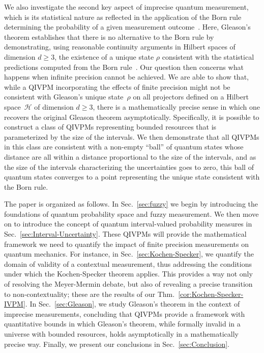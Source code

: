 \documentclass[english,reprint, aps, prl,superscriptaddress, showpacs,
showkeys, longbibliography, amsmath, amssymb, floatfix]{revtex4-1}
\theoremstyle{plain}
\theoremstyle{definition}
\newcommand{\Hilb}{\mathcal{H}}
\newcommand{\andy}[1]{\fbox{\begin{minipage}{0.9\linewidth}\color{blue}{Andy says: #1}\end{minipage}}}
\begin{document}
We also investigate the second key aspect of imprecise quantum
measurement, which is its statistical nature as reflected in the
application of the Born rule determining the probability of a given
measurement outcome~\citep{Born1983bibTeX,Mermin2007,Jaeger2007}.
Here, Gleason's theorem establishes that there is no alternative to
the Born rule by demonstrating, using reasonable continuity arguments
in Hilbert spaces of dimension $d\ge3$, the existence of a unique
state $\rho$ consistent with the statistical predictions computed from
the Born rule~\citep{gleason1957,Redhead1987-REDINA,peres1995quantum}.
Our question then concerns what happens when infinite precision cannot
be achieved.  We are able to show that, while a QIVPM incorporating
the effects of finite precision might not be consistent with Gleason's
unique state~$\rho$ on all projectors defined on a Hilbert
space~$\Hilb$ of dimension $d\ge3$, there is a mathematically precise
sense in which one recovers the original Gleason theorem
asymptotically.  Specifically, it is possible to construct a class of
QIVPMs representing bounded resources that is parameterized by the
size of the intervals. We then demonstrate that all QIVPMs in this
class are consistent with a non-empty ``ball'' of quantum states whose
distance are all within a distance proportional to the size of the
intervals, and as the size of the intervals characterizing the
uncertainties goes to zero, this ball of quantum states converges to a
point representing the unique state consistent with the Born rule. 

The paper is organized as follows.  In Sec.~\ref{sec:fuzzy} we begin
by introducing the foundations of quantum probability space and fuzzy
measurement.  We then move on to introduce the concept of quantum
interval-valued probability measures in
Sec.~\ref{sec:Interval-Uncertainty}.  These QIVPMs will provide the
mathematical framework we need to quantify the impact of finite
precision measurements on quantum mechanics.  For instance, in
Sec.~\ref{sec:Kochen-Specker}, we quantify the domain of validity of a
contextual measurement, thus addressing the conditions under which the
Kochen-Specker theorem applies.  This provides a way not only of
resolving the Meyer-Mermin debate, but also of revealing a precise
transition to non-contextuality; these are the results of our
Thm.~\ref{cor:Kochen-Specker-IVPM}.  In Sec.~\ref{sec:Gleason}, we
study Gleason's theorem in the context of imprecise measurements,
concluding that QIVPMs provide a framework with quantitative bounds in
which Gleason's theorem, while formally invalid in a universe with
bounded resources, holds asymptotically in a mathematically precise
way.  Finally, we present our conclusions in
Sec.~\ref{sec:Conclusion}.
\end{document}

